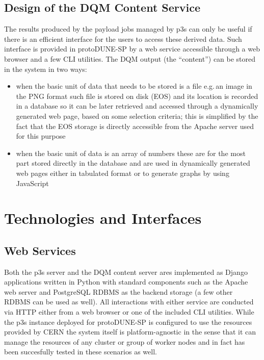 \documentclass{webofc}
\newcommand{\pd}{protoDUNE\xspace}
\begin{document}
\subsection{Design of the DQM Content Service}
The results produced by the payload jobs managed by p3s can only be useful if there is an
efficient interface for the users to access these derived data. Such interface is provided in \pd-SP
by a web service accessible through a web browser and a few CLI utilities.
The DQM output (the ``content'') can be stored in the system in two ways:
\begin{itemize}

\item when the basic unit of data that needs to be stored is a file e.g.\,an image in the PNG format such
file is stored on disk (EOS) and its location is recorded in a database so it can be later retrieved
and accessed through a dynamically generated web page,  based on some selection criteria; 
this is simplified by the fact that the EOS storage is directly accessible from the Apache server
used for this purpose

\item when the basic unit of data is an array of numbers these are for the most part stored directly
in the database and are used in dynamically generated web pages either in tabulated format or
to generate graphs by using JavaScript

\end{itemize}



\section{Technologies and Interfaces}
\subsection{Web Services}

Both the p3s server and the DQM content server ares implemented as Django
\cite{django} applications written in Python with standard components such
as the Apache web server and PostgreSQL RDBMS as the backend storage
(a few other RDBMS can be used as well). All interactions with either service
are conducted via HTTP either from a web browser or one of the included CLI utilities.
While the p3s instance deployed for \pd-SP is configured to use
the resources provided by CERN the system itself is platform-agnostic in the sense that
it can manage the resources of any cluster or group of worker nodes and in fact has
been succesfully tested in these scenarios as well.
\end{document}
